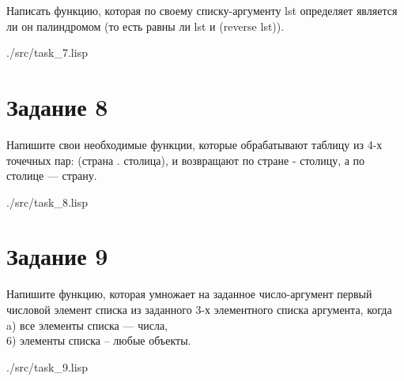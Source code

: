 Написать функцию, которая по своему списку-аргументу lst определяет является ли он палиндромом (то есть равны ли lst и (reverse lst)).

\begin{lstinputlisting}[
	caption={Задание 7},
	label={lst:t7},
	style={lsp},
	]{./src/task_7.lisp}
\end{lstinputlisting}

\section*{Задание 8}

Напишите свои необходимые функции, которые обрабатывают таблицу из 4-х точечных пар: (страна . столица), и возвращают по стране - столицу, а по столице — страну.

\begin{lstinputlisting}[
	caption={Задание 8},
	label={lst:t8},
	style={lsp},
	]{./src/task_8.lisp}
\end{lstinputlisting}

\section*{Задание 9}

Напишите функцию, которая умножает на заданное число-аргумент первый числовой элемент списка из заданного 3-х элементного списка аргумента, когда \\
a) все элементы списка --- числа, \\
6) элементы списка -- любые объекты.

\begin{lstinputlisting}[
	caption={Задание 9},
	label={lst:t9},
	style={lsp},
	]{./src/task_9.lisp}
\end{lstinputlisting}